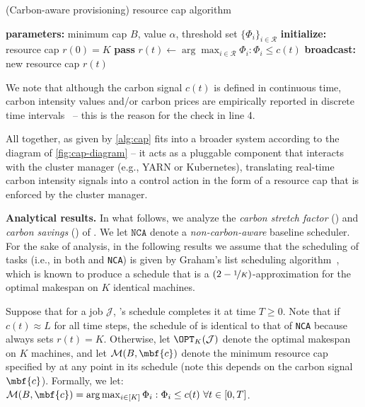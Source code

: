 \begin{algorithm}[h]
	\caption{\CAP (Carbon-aware provisioning) resource cap algorithm}
	\label{alg:cap}
	\begin{algorithmic}[1]
		\STATE \textbf{parameters:} minimum cap $B$, value $\alpha$, threshold set $\{ \Phi_i \}_{i \in \mathcal{R}}$
        \STATE \textbf{initialize:} resource cap $r(0) = K$
        \STATE \textbf{pass}
        \ELSE
        \STATE $r(t) \gets \arg \max_{i\in \mathcal{R}} \Phi_i : \Phi_i \le c(t)$
        \STATE \textbf{broadcast:} new resource cap $r(t)$
        \ENDIF
        \ENDWHILE
	\end{algorithmic}
\end{algorithm}	

We note that although the carbon signal $c(t)$ is defined in continuous time, carbon intensity values and/or carbon prices are empirically reported in discrete time intervals~\cite{electricity-map, watttime} -- this is the reason for the check in line 4.

All together, \CAP as given by \autoref{alg:cap} fits into a broader system according to the diagram of \autoref{fig:cap-diagram} -- it acts as a pluggable component that interacts with the cluster manager (e.g., YARN or Kubernetes), translating real-time carbon intensity signals into a control action in the form of a resource cap that is enforced by the cluster manager.


\smallskip
\noindent\textbf{Analytical results. }
In what follows, we analyze the \textit{carbon stretch factor} () and \textit{carbon savings} () of \CAP.
We let $\texttt{NCA}$ denote a \textit{non-carbon-aware} baseline scheduler.
For the sake of analysis, in the following results we assume that the scheduling of tasks (i.e., in both \CAP and \texttt{NCA}) is given by Graham's list scheduling algorithm~\cite{Graham:66}, which is known to produce a schedule that is a $(2 - \nicefrac{1}{K})$-approximation for the optimal makespan on $K$ identical machines.






Suppose that for a job $\mathcal{J}$, \CAP's schedule completes it at time $T \geq 0$.
Note that if $c(t) \approx L$ for all time steps, the schedule of \CAP is identical to that of \texttt{NCA} because \CAP always sets $r(t) = K$.  %
Otherwise, let $\OPT_{K}(\mathcal{J})$ denote the optimal makespan on $K$ machines, and let $\mathcal{M}(B, \mbf{c})$ denote the minimum resource cap specified by \CAP at any point in its schedule (note this depends on the carbon signal $\mbf{c}$).  Formally, we let: $\mathcal{M}(B, \mbf{c}) = \arg \max_{i\in[K]} \Phi_i : \Phi_i \le c(t) \ \forall t \in [0, T]$.

